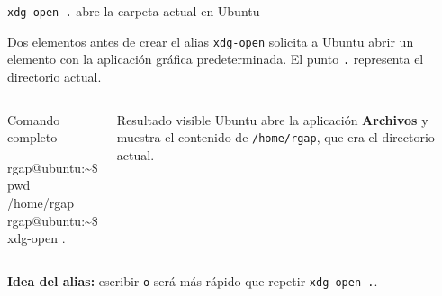 \documentclass[aspectratio=169,10pt,c]{beamer}
\begin{document}
\begin{frame}{\texttt{xdg-open .} abre la carpeta actual en Ubuntu}
\begin{block}{Dos elementos antes de crear el alias}
\small \texttt{xdg-open} solicita a Ubuntu abrir un elemento con la aplicación gráfica predeterminada. El punto \texttt{.} representa el directorio actual.
\end{block}
\begin{columns}[T,onlytextwidth]
\begin{exampleblock}{Comando completo}
\begin{terminal}
rgap@ubuntu:\textasciitilde\$ pwd\\
/home/rgap\\
rgap@ubuntu:\textasciitilde\$ xdg-open .
\end{terminal}
\end{exampleblock}
\begin{alertblock}{Resultado visible}
\small Ubuntu abre la aplicación \textbf{Archivos} y muestra el contenido de \texttt{/home/rgap}, que era el directorio actual.
\end{alertblock}
\end{columns}
\vspace{4mm}
\small\textbf{Idea del alias:} escribir \texttt{o} será más rápido que repetir \texttt{xdg-open .}.
\end{frame}
\end{document}
